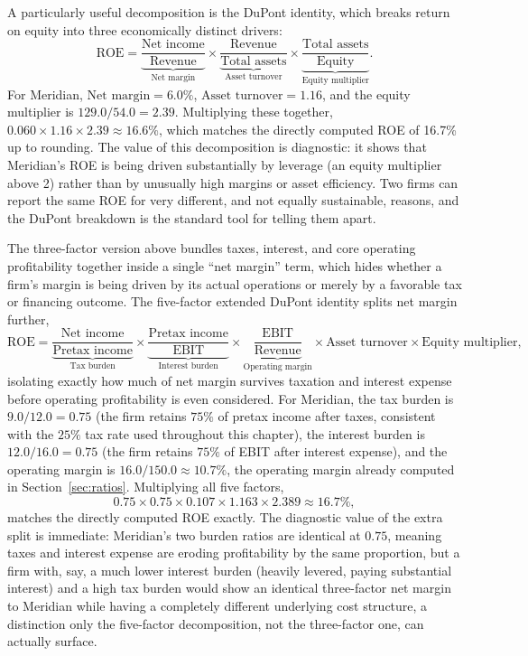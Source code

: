 \documentclass[../ai_in_finance]{subfiles}
\begin{document}
A particularly useful decomposition is the DuPont identity, which breaks return on equity into three economically distinct drivers:
\begin{equation*}
\text{ROE} = \underbrace{\frac{\text{Net income}}{\text{Revenue}}}_{\text{Net margin}} \times \underbrace{\frac{\text{Revenue}}{\text{Total assets}}}_{\text{Asset turnover}} \times \underbrace{\frac{\text{Total assets}}{\text{Equity}}}_{\text{Equity multiplier}}.
\end{equation*}
For Meridian, $\text{Net margin} = 6.0\%$, $\text{Asset turnover} = 1.16$, and the equity multiplier is $129.0/54.0 = 2.39$. Multiplying these together, $0.060 \times 1.16 \times 2.39 \approx 16.6\%$, which matches the directly computed ROE of 16.7\% up to rounding. The value of this decomposition is diagnostic: it shows that Meridian's ROE is being driven substantially by leverage (an equity multiplier above 2) rather than by unusually high margins or asset efficiency. Two firms can report the same ROE for very different, and not equally sustainable, reasons, and the DuPont breakdown is the standard tool for telling them apart.

The three-factor version above bundles taxes, interest, and core operating profitability together inside a single ``net margin'' term, which hides whether a firm's margin is being driven by its actual operations or merely by a favorable tax or financing outcome. The five-factor extended DuPont identity splits net margin further,
\begin{equation*}
\text{ROE} = \underbrace{\frac{\text{Net income}}{\text{Pretax income}}}_{\text{Tax burden}} \times \underbrace{\frac{\text{Pretax income}}{\text{EBIT}}}_{\text{Interest burden}} \times \underbrace{\frac{\text{EBIT}}{\text{Revenue}}}_{\text{Operating margin}} \times \text{Asset turnover} \times \text{Equity multiplier},
\end{equation*}
isolating exactly how much of net margin survives taxation and interest expense before operating profitability is even considered. For Meridian, the tax burden is $9.0/12.0 = 0.75$ (the firm retains $75\%$ of pretax income after taxes, consistent with the $25\%$ tax rate used throughout this chapter), the interest burden is $12.0/16.0 = 0.75$ (the firm retains $75\%$ of EBIT after interest expense), and the operating margin is $16.0/150.0 \approx 10.7\%$, the operating margin already computed in Section~\ref{sec:ratios}. Multiplying all five factors,
\begin{equation*}
0.75 \times 0.75 \times 0.107 \times 1.163 \times 2.389 \approx 16.7\%,
\end{equation*}
matches the directly computed ROE exactly. The diagnostic value of the extra split is immediate: Meridian's two burden ratios are identical at $0.75$, meaning taxes and interest expense are eroding profitability by the same proportion, but a firm with, say, a much lower interest burden (heavily levered, paying substantial interest) and a high tax burden would show an identical three-factor net margin to Meridian while having a completely different underlying cost structure, a distinction only the five-factor decomposition, not the three-factor one, can actually surface.
\end{document}
